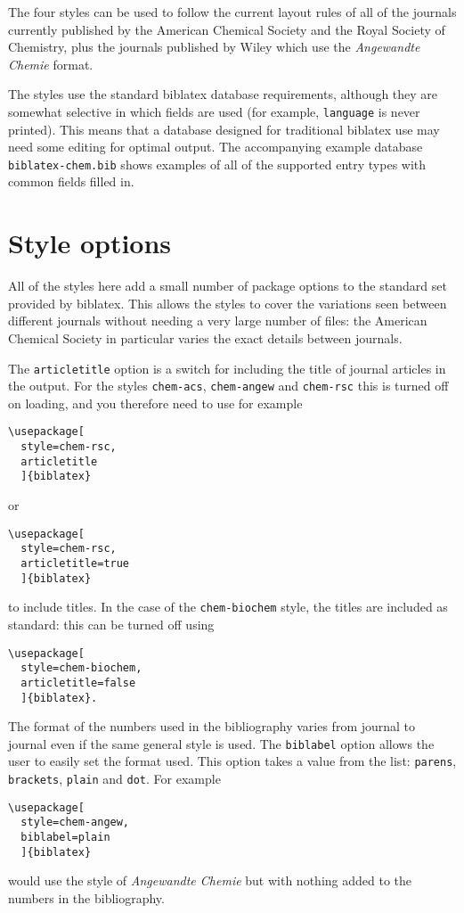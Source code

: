 \documentclass[a4paper]{article}
\makeatletter
\newcommand*{\DescribeOption}[1]{%
  \leavevmode
  \@bsphack
  \marginpar{\texttt{#1}}%
  \@esphack
  \ignorespaces
}
\makeatother
\begin{document}
The four styles can be used to follow the current layout rules
of all of the journals currently published by the American 
Chemical Society and the Royal Society of Chemistry, plus 
the journals published by Wiley which use the \emph{Angewandte
Chemie} format.

The styles use the standard \textsf{biblatex} database 
requirements, although they are somewhat selective in which
fields are used (for example, \texttt{language} is never 
printed).  This means that a database designed for traditional
\textsf{biblatex} use may need some editing for optimal output.
The accompanying example database \texttt{biblatex-chem.bib} 
shows examples of all of the supported entry types with common
fields filled in.

\section{Style options}

All of the styles here add a small number of package options to 
the standard set provided by \textsf{biblatex}. This allows 
the styles to cover the variations seen between different 
journals without needing a very large number of files: the 
American Chemical Society in particular varies the exact details
between journals.

\DescribeOption{articletitle}
The \texttt{articletitle} option is a switch for including the 
title of journal articles in the output. For the styles 
\texttt{chem-acs}, \texttt{chem-angew} and \texttt{chem-rsc} this 
is turned off on loading, and you therefore need to use for 
example
\begin{verbatim}
\usepackage[
  style=chem-rsc,
  articletitle
  ]{biblatex}
\end{verbatim}
or
\begin{verbatim}
\usepackage[
  style=chem-rsc,
  articletitle=true
  ]{biblatex}
\end{verbatim}
to include titles.  In the case of the \texttt{chem-biochem} 
style, the titles are included as standard: this can be turned
off using
\begin{verbatim}
\usepackage[
  style=chem-biochem,
  articletitle=false
  ]{biblatex}.
\end{verbatim}

\DescribeOption{biblabel}
The format of the numbers used in the bibliography varies from
journal to journal even if the same general style is used.  The
\texttt{biblabel} option allows the user to easily set the 
format used.  This option takes a value from the list: 
\texttt{parens}, \texttt{brackets}, \texttt{plain} and 
\texttt{dot}.
For example
\begin{verbatim}
\usepackage[
  style=chem-angew,
  biblabel=plain
  ]{biblatex}
\end{verbatim}
would use the style of \emph{Angewandte Chemie} but with nothing
added to the numbers in the bibliography.
\end{document}
